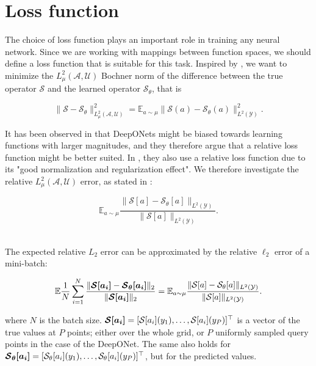 \section{Loss function}

The choice of loss function plays an important role in training any neural network. Since we are working with mappings between function spaces, we should define a loss function that is suitable for this task.
Inspired by , we want to minimize the \(L_\mu^2(\mathcal{A}, \mathcal{U})\) Bochner norm of the difference between the true operator \(\mathcal{S}\) and the learned operator \(\mathcal{S}_\theta\), that is 


\begin{equation}
    \|\mathcal{S}-\mathcal{S}_\theta\|_{L_\mu^2(\mathcal{A}, \mathcal{U})}^2 = \mathbb{E}_{a\sim\mu}\|\mathcal{S}(a)-\mathcal{S}_\theta(a)\|_{L^2(\mathcal{Y})}^2. 
\end{equation}

It has been observed in  that DeepONets might be biased towards learning functions with larger magnitudes, and they therefore argue that a relative loss function might be better suited.
In \cite{kovachkiNeuralOperatorLearning2024}, they also use a relative loss function due to its "good normalization and regularization effect". We therefore investigate the relative \(L_\mu^2(\mathcal{A}, \mathcal{U})\) error, as stated in \cite{kovachkiNeuralOperatorLearning2024}:


\begin{equation}
    \mathbb{E}_{a\sim\mu}\frac{\|\mathcal{S}[a]-\mathcal{S}_\theta[a]\|_{L^2(\mathcal{Y})}}{\|\mathcal{S}[a]\|_{L^2(\mathcal{Y})}}.
    \label{eq:expected_relative_error}
\end{equation}

\begin{proposition}
    \hfill\\
    The expected relative \(L_2\) error can be approximated by the relative \(\ell_2\) error of a mini-batch:

    \begin{equation}
        \mathbb{E} \frac{1}{N} \sum_{i=1}^{N} \frac{\|\bm{\mathcal{S}[a_i]}- \bm{\mathcal{S}_\theta[a_i]}\|_2}{\|\bm{\mathcal{S}[a_i]}\|_2}=\mathbb{E}_{a\sim\mu}\frac{\|\mathcal{S}[a]-\mathcal{S}_\theta[a]\|_{L^2(\mathcal{Y})}}{\|\mathcal{S}[a]\|_{L^2(\mathcal{Y})}}.
    \end{equation}

    where \(N\) is the batch size. 
    \(\bm{\mathcal{S}[a_i]}=[\mathcal{S}[a_i](y_1), \ldots, \mathcal{S}[a_i](y_P)]^\top\) 
    is a vector of the true values at \(P\) points; either over the whole grid, or \(P\) uniformly sampled query points in the case of the DeepONet. 
    The same also holds for \(\bm{\mathcal{S}_\theta[a_i]}=[\mathcal{S}_\theta[a_i](y_1), \ldots, \mathcal{S}_\theta[a_i](y_P)]^\top\), but for the predicted values.
\end{proposition}

